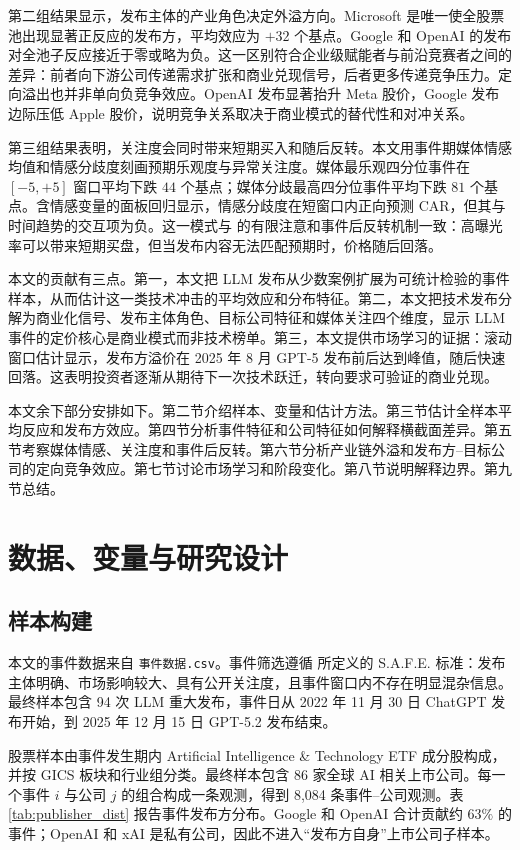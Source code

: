 \documentclass[11pt,fontset=fandol]{ctexart}
\begin{document}
第二组结果显示，发布主体的产业角色决定外溢方向。Microsoft 是唯一使全股票池出现显著正反应的发布方，平均效应为 $+32$ 个基点。Google 和 OpenAI 的发布对全池子反应接近于零或略为负。这一区别符合企业级赋能者与前沿竞赛者之间的差异：前者向下游公司传递需求扩张和商业兑现信号，后者更多传递竞争压力。定向溢出也并非单向负竞争效应。OpenAI 发布显著抬升 Meta 股价，Google 发布边际压低 Apple 股价，说明竞争关系取决于商业模式的替代性和对冲关系。

第三组结果表明，关注度会同时带来短期买入和随后反转。本文用事件期媒体情感均值和情感分歧度刻画预期乐观度与异常关注度。媒体最乐观四分位事件在 $[-5,+5]$ 窗口平均下跌 $44$ 个基点；媒体分歧最高四分位事件平均下跌 $81$ 个基点。含情感变量的面板回归显示，情感分歧度在短窗口内正向预测 CAR，但其与时间趋势的交互项为负。这一模式与 \citet{DaEngelbergGao2011} 的有限注意和事件后反转机制一致：高曝光率可以带来短期买盘，但当发布内容无法匹配预期时，价格随后回落。

本文的贡献有三点。第一，本文把 LLM 发布从少数案例扩展为可统计检验的事件样本，从而估计这一类技术冲击的平均效应和分布特征。第二，本文把技术发布分解为商业化信号、发布主体角色、目标公司特征和媒体关注四个维度，显示 LLM 事件的定价核心是商业模式而非技术榜单。第三，本文提供市场学习的证据：滚动窗口估计显示，发布方溢价在 2025 年 8 月 GPT-5 发布前后达到峰值，随后快速回落。这表明投资者逐渐从期待下一次技术跃迁，转向要求可验证的商业兑现。

本文余下部分安排如下。第二节介绍样本、变量和估计方法。第三节估计全样本平均反应和发布方效应。第四节分析事件特征和公司特征如何解释横截面差异。第五节考察媒体情感、关注度和事件后反转。第六节分析产业链外溢和发布方--目标公司的定向竞争效应。第七节讨论市场学习和阶段变化。第八节说明解释边界。第九节总结。

\section{数据、变量与研究设计}
\label{sec:data}

\subsection{样本构建}

本文的事件数据来自 \texttt{事件数据.csv}。事件筛选遵循 \cite{proposal} 所定义的 S.A.F.E. 标准：发布主体明确、市场影响较大、具有公开关注度，且事件窗口内不存在明显混杂信息。最终样本包含 94 次 LLM 重大发布，事件日从 2022 年 11 月 30 日 ChatGPT 发布开始，到 2025 年 12 月 15 日 GPT-5.2 发布结束。

股票样本由事件发生期内 Artificial Intelligence \& Technology ETF 成分股构成，并按 GICS 板块和行业组分类。最终样本包含 86 家全球 AI 相关上市公司。每一个事件 $i$ 与公司 $j$ 的组合构成一条观测，得到 8{,}084 条事件--公司观测。表 \ref{tab:publisher_dist} 报告事件发布方分布。Google 和 OpenAI 合计贡献约 $63\%$ 的事件；OpenAI 和 xAI 是私有公司，因此不进入“发布方自身”上市公司子样本。
\end{document}
